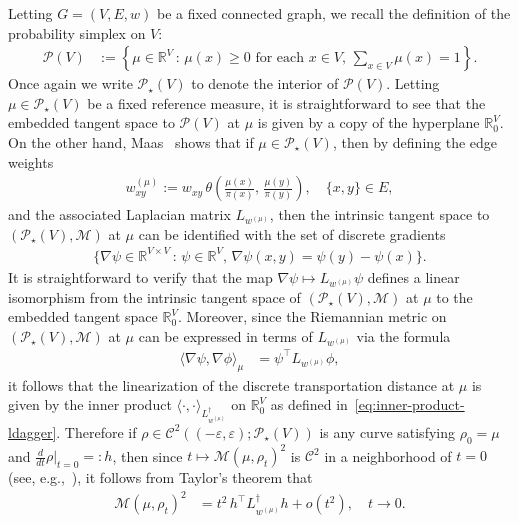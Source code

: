 \documentclass[11pt,a4paper]{article}
\newcommand{\Maas}{\mathcal{M}}
\newcommand{\Prob}{\mathscr{P}}
\begin{document}
Letting $G=(V,E,w)$ be a fixed connected graph, we recall the definition of the probability simplex on $V$:
    \begin{align*}
        \Prob(V) &:= \left\{ \mu \in\mathbb{R}^{V} \,:\, \mu(x)\geq 0\text{ for each }x\in V,\, \sum_{x\in V} \mu(x) = 1\right\}.
    \end{align*}
Once again we write $\Prob_\star(V)$ to denote the interior of $\Prob(V)$. Letting $\mu\in\Prob_\star(V)$ be a fixed reference measure, it is straightforward to see that the embedded tangent space to $\Prob(V)$ at $\mu$ is given by a copy of the hyperplane $\mathbb{R}^{V}_0$. On the other hand, Maas~\cite{maas2011gradient} shows that if $\mu\in\Prob_\star(V)$, then by defining the edge weights
    \begin{align*}
        w^{(\mu)}_{xy} := w_{xy}\,\theta\left(\frac{\mu(x)}{\pi(x)},\,\frac{\mu(y)}{\pi(y)}\right),\quad \{x,y\}\in E,
    \end{align*}
and the associated Laplacian matrix $L_{w^{(\mu)}}$, then the intrinsic tangent space to $(\Prob_\star(V),\Maas)$ at $\mu$ can be identified with the set of discrete gradients
    \begin{align*}
        \{\nabla \psi \in\mathbb{R}^{V\times V} \,:\, \psi\in\mathbb{R}^{V},\, \nabla \psi(x,y) = \psi(y) - \psi(x)\}.
    \end{align*}
It is straightforward to verify that the map $\nabla \psi \mapsto L_{w^{(\mu)}} \psi$ defines a linear isomorphism from the intrinsic tangent space of $(\Prob_\star(V),\Maas)$ at $\mu$ to the embedded tangent space $\mathbb{R}^{V}_0$. Moreover, since the Riemannian metric on $(\Prob_\star(V),\Maas)$ at $\mu$ can be expressed in terms of $L_{w^{(\mu)}}$ via the formula
    \begin{align*}
        \langle \nabla \psi, \nabla \phi\rangle_\mu &= \psi^\top L_{w^{(\mu)}} \phi,
    \end{align*}
it follows that the linearization of the discrete transportation distance at $\mu$ is given by the inner product $\langle\cdot,\cdot\rangle_{L_{w^{(\mu)}}^\dagger}$ on $\mathbb{R}^{V}_0$ as defined in~\cref{eq:inner-product-ldagger}. Therefore if $\rho \in \mathcal{C}^2((-\varepsilon,\varepsilon);\Prob_\star(V))$ is any curve satisfying $\rho_0 = \mu$ and $\frac{d}{dt}\rho|_{t=0}=:h$, then since $t\mapsto \Maas(\mu,\rho_t)^2$ is $\mathcal{C}^{2}$ in a neighborhood of $t=0$ (see, e.g.,~\cite[Lemma 6.8]{lee2018introduction}), it follows from Taylor's theorem that 
    \begin{align}\label{eq:asymptotic-linearization}
        \Maas(\mu,\rho_t)^2 &= t^2 \, h^\top L_{w^{(\mu)}}^\dagger h + o(t^2),\quad t\to 0.
    \end{align}
\end{document}
